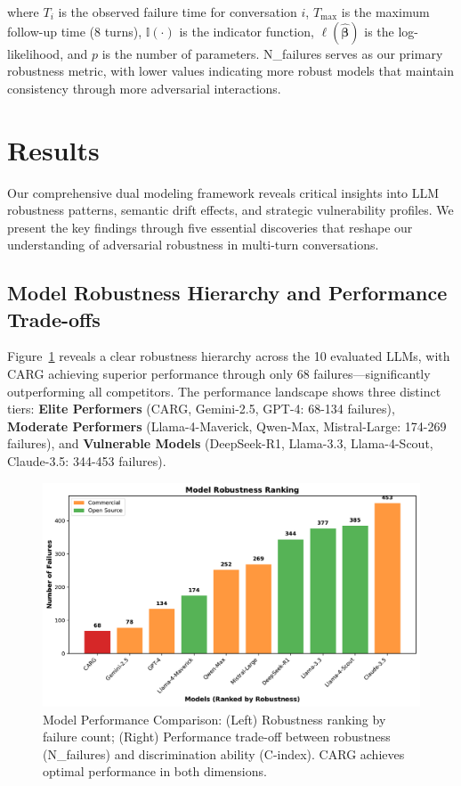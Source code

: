 \documentclass[letterpaper]{article}
\begin{document}
where $T_i$ is the observed failure time for conversation $i$, $T_{\max}$ is the maximum follow-up time (8 turns), $\mathbb{I}(\cdot)$ is the indicator function, $\ell(\hat{\boldsymbol{\beta}})$ is the log-likelihood, and $p$ is the number of parameters. N\_failures serves as our primary robustness metric, with lower values indicating more robust models that maintain consistency through more adversarial interactions.

\section{Results}

Our comprehensive dual modeling framework reveals critical insights into LLM robustness patterns, semantic drift effects, and strategic vulnerability profiles. We present the key findings through five essential discoveries that reshape our understanding of adversarial robustness in multi-turn conversations.

\subsection{Model Robustness Hierarchy and Performance Trade-offs}

Figure~\ref{fig:performance_comparison} reveals a clear robustness hierarchy across the 10 evaluated LLMs, with CARG achieving superior performance through only 68 failures—significantly outperforming all competitors. The performance landscape shows three distinct tiers: \textbf{Elite Performers} (CARG, Gemini-2.5, GPT-4: 68-134 failures), \textbf{Moderate Performers} (Llama-4-Maverick, Qwen-Max, Mistral-Large: 174-269 failures), and \textbf{Vulnerable Models} (DeepSeek-R1, Llama-3.3, Llama-4-Scout, Claude-3.5: 344-453 failures).

\begin{figure}[!ht]
\centering
\includegraphics[width=\columnwidth]{figs/model_performance_comparison_1.pdf}
\caption{Model Performance Comparison: (Left) Robustness ranking by failure count; (Right) Performance trade-off between robustness (N\_failures) and discrimination ability (C-index). CARG achieves optimal performance in both dimensions.}
\label{fig:performance_comparison}
\end{figure}
\end{document}
